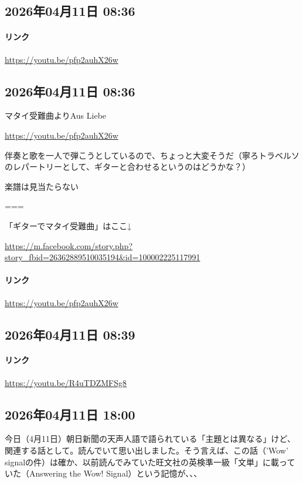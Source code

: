\subsection*{2026年04月11日 08:36}

\paragraph{リンク}
\url{https://youtu.be/pfp2auhX26w}

\subsection*{2026年04月11日 08:36}

マタイ受難曲よりAus Liebe

\url{https://youtu.be/pfp2auhX26w}

伴奏と歌を一人で弾こうとしているので、ちょっと大変そうだ（寧ろトラベルソのレパートリーとして、ギターと合わせるというのはどうかな？）

楽譜は見当たらない

===

「ギターでマタイ受難曲」はここ↓

\url{https://m.facebook.com/story.php?story_fbid=26362889510035194&id=100002225117991}

\paragraph{リンク}
\url{https://youtu.be/pfp2auhX26w}

\subsection*{2026年04月11日 08:39}

\paragraph{リンク}
\url{https://youtu.be/R4uTDZMFSg8}

\subsection*{2026年04月11日 18:00}

今日（4月11日）朝日新聞の天声人語で語られている「主題とは異なる」けど、関連する話として。読んでいて思い出しました。そう言えば、この話（’Wow’ signalの件）は確か、以前読んでみていた旺文社の英検準一級「文単」に載っていた（Answering the Wow! Signal）という記憶が、、、

